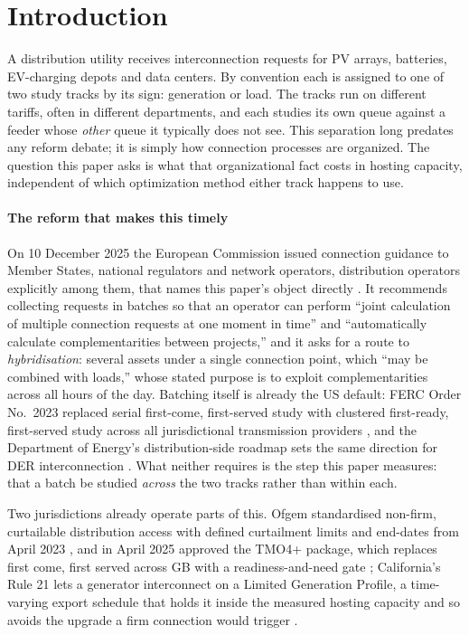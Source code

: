 \documentclass[review,authoryear,12pt]{elsarticle}
\begin{document}
\section{Introduction}
\label{sec:intro}

A distribution utility receives interconnection requests for PV arrays,
batteries, EV-charging depots and data centers. By convention each is assigned
to one of two study tracks by its sign: generation or load. The
tracks run on different tariffs, often in different departments, and each
studies its own queue against a feeder whose \emph{other} queue it typically
does not see. This separation long predates any reform debate; it is simply
how connection processes are organized. The question this paper asks is what
that organizational fact costs in hosting capacity, independent of which
optimization method either track happens to use.

\paragraph{The reform that makes this timely}
On 10 December 2025 the European Commission issued connection guidance to
Member States, national regulators and network operators, distribution
operators explicitly among them, that names this paper's object directly
\citep{ec_gridconn2025}. It recommends collecting requests in batches so that
an operator can perform ``joint calculation of multiple connection requests at
one moment in time'' and ``automatically calculate complementarities between
projects,'' and it asks for a route to \emph{hybridisation}: several assets
under a single connection point, which ``may be combined with loads,'' whose
stated purpose is to exploit complementarities across all hours of the day.
Batching itself is already the US default: FERC Order No.~2023 replaced serial
first-come, first-served study with clustered first-ready, first-served study
across all jurisdictional transmission providers \citep{ferc2023_2023}, and the
Department of Energy's distribution-side roadmap sets the same direction for
{DER} interconnection \citep{doe_i2x_der2024}. What neither requires is the
step this paper measures: that a batch be studied \emph{across} the two tracks
rather than within each.

Two jurisdictions already operate parts of this. Ofgem standardised non-firm,
curtailable distribution access with defined curtailment limits and end-dates
from April 2023 \citep{ofgem_accessscr2022}, and in April 2025 approved the
{TMO4+} package, which replaces first come, first served across {GB} with a
readiness-and-need gate \citep{ofgem_tmo4_2025}; California's Rule 21 lets a
generator interconnect on a Limited Generation Profile, a time-varying export
schedule that holds it inside the measured hosting capacity and so avoids the
upgrade a firm connection would trigger \citep{cpuc_lgp2020}.
\end{document}
